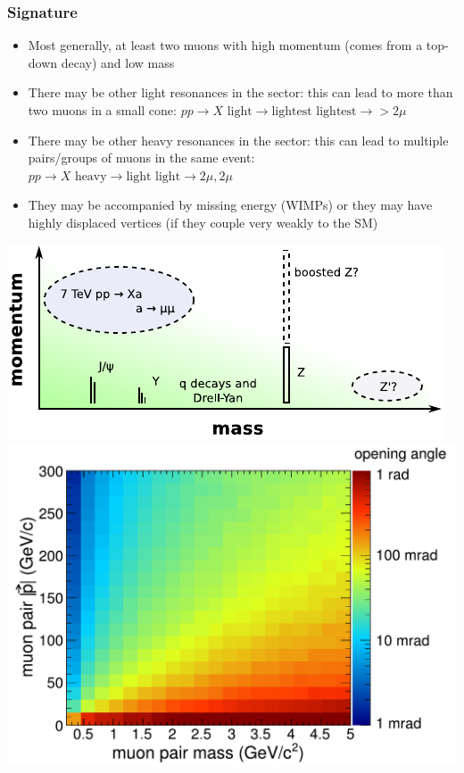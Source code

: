 \documentclass[compress]{beamer}
\begin{document}
\begin{frame}
\frametitle{Signature}
\begin{itemize}
\item Most generally, at least two muons with high momentum (comes
  from a top-down decay) and low mass

\item There may be other light resonances in the sector: this can lead
  to more than two muons in a small cone: $pp \to X \mbox{ light} \to
  \mbox{lightest}\mbox{ lightest} \to >2 \mu$

\item There may be other heavy resonances in the sector: this can lead
  to multiple pairs/groups of muons in the same event: $pp \to X
  \mbox{ heavy} \to \mbox{light}\mbox{ light} \to 2\mu, 2\mu$

\item They may be accompanied by missing energy (WIMPs) or they may
  have highly displaced vertices (if they couple very weakly to the
  SM)
\end{itemize}

\includegraphics[height=3 cm]{where_we_live.pdf}
\includegraphics[height=3 cm]{openingangle_angle.pdf}
\end{frame}
\end{document}
